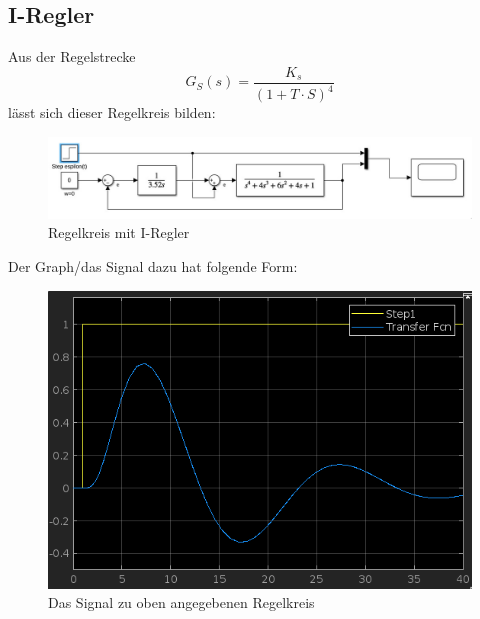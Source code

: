 \documentclass{article}
\begin{document}
		\subsection{I-Regler}
			Aus der Regelstrecke 
			$$G_S(s) = \frac{K_s}{(1 + T\cdot S)^4}$$
			lässt sich dieser Regelkreis bilden:
			\begin{figure}[h]
				\includegraphics[scale=0.5, center]{4_b_Blockschaltbild.png}
				\caption{Regelkreis mit I-Regler}
				\label{fig35: Blockschaltbild_I_Regler}
			\end{figure}
			Der Graph/das Signal dazu hat folgende Form:
			\begin{figure}[h]
				\includegraphics[scale = 0.6, center]{4_b_Graph.png}
				\caption{Das Signal zu oben angegebenen Regelkreis}
				\label{fig36: 4_b_Graph}
			\end{figure}
\newpage
\end{document}
